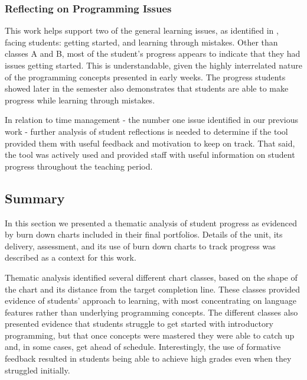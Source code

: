 
\subsubsection{Reflecting on Programming Issues} %
\label{sub:relation_to_issues}

This work helps support two of the general learning issues, as identified in , facing students: getting started, and learning through mistakes. Other than classes A and B, most of the student's progress appears to indicate that they had issues getting started. This is understandable, given the highly interrelated nature of the programming concepts presented in early weeks. The progress students showed later in the semester also demonstrates that students are able to make progress while learning through mistakes. 

In relation to time management - the number one issue identified in our previous work - further analysis of student reflections is needed to determine if the tool provided them with useful feedback and motivation to keep on track. That said, the tool was actively used and provided staff with useful information on student progress throughout the teaching period.




\subsection{Summary} %
\label{sec:progress_summary}

In this section we presented a thematic analysis of student progress as evidenced by burn down charts included in their final portfolios. Details of the unit, its delivery, assessment, and its use of burn down charts to track progress was described as a context for this work.  

Thematic analysis identified several different chart classes, based on the shape of the chart and its distance from the target completion line. These classes provided evidence of students' approach to learning, with most concentrating on language features rather than underlying programming concepts. The different classes also presented evidence that students struggle to get started with introductory programming, but that once concepts were mastered they were able to catch up and, in some cases, get ahead of schedule. Interestingly, the use of formative feedback resulted in students being able to achieve high grades even when they struggled initially.


